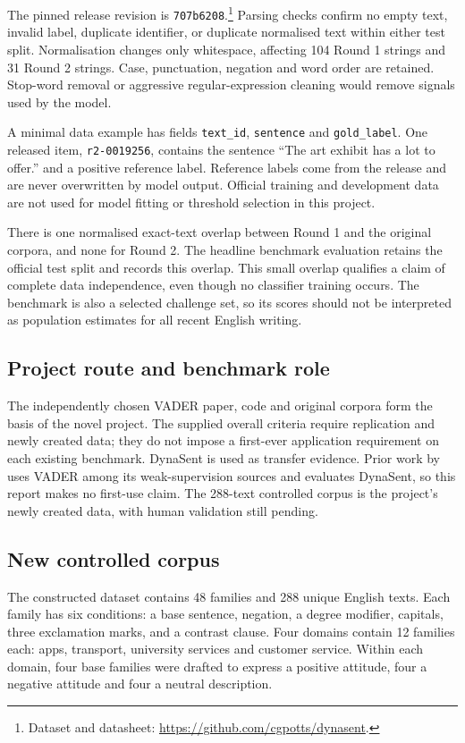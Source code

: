 \documentclass[11pt]{article}
\begin{document}
The pinned release revision is \texttt{707b6208}.\footnote{Dataset and datasheet:
\url{https://github.com/cgpotts/dynasent}.}
Parsing checks confirm no empty text, invalid label, duplicate identifier, or
duplicate normalised text within either test split. Normalisation changes only
whitespace, affecting 104 Round 1 strings and 31 Round 2 strings. Case,
punctuation, negation and word order are retained. Stop-word removal or aggressive
regular-expression cleaning would remove signals used by the model.

A minimal data example has fields \texttt{text\_id}, \texttt{sentence} and
\texttt{gold\_label}. One released item, \texttt{r2-0019256}, contains the sentence
``The art exhibit has a lot to offer.'' and a positive reference label.
Reference labels come from the release and are never overwritten by model output.
Official training and development data are not used for model fitting or threshold
selection in this project.

There is one normalised exact-text overlap between Round 1 and the original
corpora, and none for Round 2. The headline benchmark evaluation retains the
official test split and records this overlap. This small overlap qualifies a
claim of complete data independence, even though no classifier training occurs.
The benchmark is also a selected challenge set, so its scores should not be
interpreted as population estimates for all recent English writing.

\subsection{Project route and benchmark role}
The independently chosen VADER paper, code and original corpora form the basis of
the novel project. The supplied overall criteria require replication and newly
created data; they do not impose a first-ever application requirement on each
existing benchmark. DynaSent is used as transfer evidence. Prior work by
\citet{wang2026msra} uses VADER among its weak-supervision sources and evaluates
DynaSent, so this report makes no first-use claim. The 288-text controlled corpus
is the project's newly created data, with human validation still pending.

\subsection{New controlled corpus}
The constructed dataset contains 48 families and 288 unique English texts. Each
family has six conditions: a base sentence, negation, a degree modifier, capitals,
three exclamation marks, and a contrast clause. Four domains contain 12 families
each: apps, transport, university services and customer service. Within each
domain, four base families were drafted to express a positive attitude, four a
negative attitude and four a neutral description.
\end{document}
